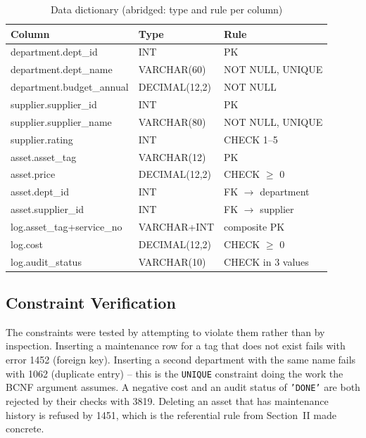 \documentclass[conference,9pt]{IEEEtran}
\begin{document}
\begin{table}[t]
\centering
\caption{Data dictionary (abridged: type and rule per column)}
\label{tab:dict}
\scriptsize
\begin{tabular}{@{}lll@{}}
\toprule
\textbf{Column} & \textbf{Type} & \textbf{Rule} \\
\midrule
department.dept\_id        & INT          & PK \\
department.dept\_name      & VARCHAR(60)  & NOT NULL, UNIQUE \\
department.budget\_annual  & DECIMAL(12,2)& NOT NULL \\
supplier.supplier\_id      & INT          & PK \\
supplier.supplier\_name    & VARCHAR(80)  & NOT NULL, UNIQUE \\
supplier.rating            & INT          & CHECK 1--5 \\
asset.asset\_tag           & VARCHAR(12)  & PK \\
asset.price                & DECIMAL(12,2)& CHECK $\geq$ 0 \\
asset.dept\_id             & INT          & FK $\to$ department \\
asset.supplier\_id         & INT          & FK $\to$ supplier \\
log.asset\_tag+service\_no & VARCHAR+INT  & composite PK \\
log.cost                   & DECIMAL(12,2)& CHECK $\geq$ 0 \\
log.audit\_status          & VARCHAR(10)  & CHECK in 3 values \\
\bottomrule
\end{tabular}
\end{table}

\subsection{Constraint Verification}
The constraints were tested by attempting to violate them rather than by
inspection. Inserting a maintenance row for a tag that does not exist fails
with error 1452 (foreign key). Inserting a second department with the same
name fails with 1062 (duplicate entry) -- this is the \texttt{UNIQUE}
constraint doing the work the BCNF argument assumes. A negative cost and an
audit status of \texttt{'DONE'} are both rejected by their checks with 3819.
Deleting an asset that has maintenance history is refused by 1451, which is
the referential rule from Section~II made concrete.
\end{document}
